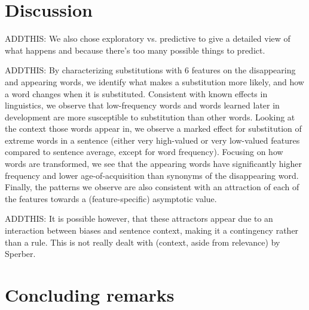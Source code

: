 \section{Discussion}





\begin{new}

ADDTHIS:
We also chose exploratory vs. predictive to give a detailed view of what happens and because there's too many possible things to predict.

ADDTHIS:
By characterizing substitutions with 6 features on the disappearing and appearing words, we identify what makes a substitution more likely, and how a word changes when it is substituted.
Consistent with known effects in linguistics, we observe that low-frequency words and words learned later in development are more susceptible to substitution than other words.
Looking at the context those words appear in, we observe a marked effect for substitution of extreme words in a sentence (either very high-valued or very low-valued features compared to sentence average, except for word frequency).
Focusing on how words are transformed, we see that the appearing words have significantly higher frequency and lower age-of-acquisition than synonyms of the disappearing word.
Finally, the patterns we observe are also consistent with an attraction of each of the features towards a (feature-specific) asymptotic value.

ADDTHIS:
It is possible however, that these attractors appear due to an interaction between biases and sentence context, making it a contingency rather than a rule. This is not really dealt with (context, aside from relevance) by Sperber.

\end{new}

\section{Concluding remarks}\label{sec:conclusion}


